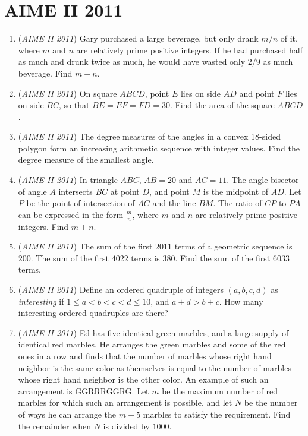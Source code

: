 \section{AIME II 2011}
        \begin{enumerate}
        	\item (\textit{AIME II 2011}) Gary purchased a large beverage, but only drank $m/n$ of it, where $m$ and $n$ are relatively prime positive integers. If he had purchased half as much and drunk twice as much, he would have wasted only $2/9$ as much beverage. Find $m+n$.


 

	\item (\textit{AIME II 2011}) On square $ABCD$, point $E$ lies on side $AD$ and point $F$ lies on side $BC$, so that $BE=EF=FD=30$. Find the area of the square $ABCD$.


 

	\item (\textit{AIME II 2011}) The degree measures of the angles in a convex 18-sided polygon form an increasing arithmetic sequence with integer values. Find the degree measure of the smallest angle.


 

	\item (\textit{AIME II 2011}) In triangle $ABC$, $AB=20$ and $AC=11$. The angle bisector of angle $A$ intersects $BC$ at point $D$, and point $M$ is the midpoint of $AD$. Let $P$ be the point of intersection of $AC$ and the line $BM$. The ratio of $CP$ to $PA$ can be expressed in the form $\frac{m}{n}$, where $m$ and $n$ are relatively prime positive integers. Find $m+n$. 


 

	\item (\textit{AIME II 2011}) The sum of the first $2011$ terms of a geometric sequence is $200$. The sum of the first $4022$ terms is $380$. Find the sum of the first $6033$ terms. 


 

	\item (\textit{AIME II 2011}) Define an ordered quadruple of integers $(a, b, c, d)$ as \textit{interesting} if $1 \le a<b<c<d \le 10$, and $a+d>b+c$. How many interesting ordered quadruples are there?


 

	\item (\textit{AIME II 2011}) Ed has five identical green marbles, and a large supply of identical red marbles. He arranges the green marbles and some of the red ones in a row and finds that the number of marbles whose right hand neighbor is the same color as themselves is equal to the number of marbles whose right hand neighbor is the other color. An example of such an arrangement is GGRRRGGRG. Let $m$ be the maximum number of red marbles for which such an arrangement is possible, and let $N$ be the number of ways he can arrange the $m+5$ marbles to satisfy the requirement. Find the remainder when $N$ is divided by $1000$.



\end{enumerate}
